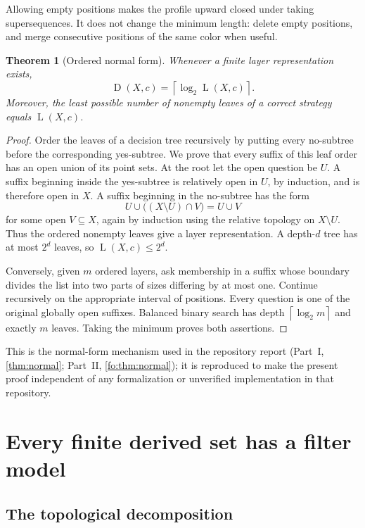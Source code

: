 \documentclass[11pt,letterpaper]{article}
\numberwithin{equation}{section}
\newtheorem{theorem}{Theorem}[section]
\theoremstyle{definition}
\theoremstyle{remark}
\theoremstyle{definition}
\newcommand{\ceil}[1]{\left\lceil#1\right\rceil}
\newcommand{\depth}{\operatorname{D}}
\newcommand{\layers}{\operatorname{L}}
\begin{document}
Allowing empty positions makes the profile upward closed under taking
supersequences. It does not change the minimum length: delete empty
positions, and merge consecutive positions of the same color when useful.

\begin{theorem}[Ordered normal form]\label{fp:thm:normal}
Whenever a finite layer representation exists,
\[
 \depth(X,c)=\ceil{\log_2\layers(X,c)}.
\]
Moreover, the least possible number of nonempty leaves of a correct
strategy equals \(\layers(X,c)\).
\end{theorem}
\begin{proof}
Order the leaves of a decision tree recursively by putting every no-subtree
before the corresponding yes-subtree. We prove that every suffix of this
leaf order has an open union of its point sets. At the root let the open
question be \(U\). A suffix beginning inside the yes-subtree is relatively
open in \(U\), by induction, and is therefore open in \(X\). A suffix
beginning in the no-subtree has the form
\[
 U\cup\bigl((X\setminus U)\cap V\bigr)=U\cup V
\]
for some open \(V\subseteq X\), again by induction using the relative
topology on \(X\setminus U\). Thus the ordered nonempty leaves give a
layer representation. A depth-\(d\) tree has at most \(2^d\) leaves, so
\(\layers(X,c)\leq2^d\).

Conversely, given \(m\) ordered layers, ask membership in a suffix whose
boundary divides the list into two parts of sizes differing by at most one.
Continue recursively on the appropriate interval of positions. Every
question is one of the original globally open suffixes. Balanced binary
search has depth \(\ceil{\log_2m}\) and exactly \(m\) leaves. Taking the
minimum proves both assertions.
\end{proof}

This is the normal-form mechanism used in the repository report
(Part~I, \cref{thm:normal}; Part~II, \cref{fo:thm:normal}); it is reproduced to make the present proof independent of
any formalization or unverified implementation in that repository.

\section{Every finite derived set has a filter model}
\label{fp:sec:filters}

\subsection{The topological decomposition}
\end{document}
